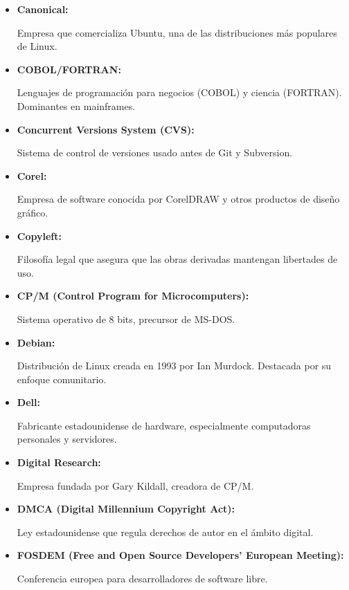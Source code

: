 \documentclass[a4paper,12pt]{article}
\begin{document}
\begin{itemize}
\item \hypertarget{canonical}{\textbf{Canonical:}} Empresa que comercializa
Ubuntu, una de las distribuciones más populares de Linux.  \label{canonical}

\item \hypertarget{cobolfortran}{\textbf{COBOL/FORTRAN:}} Lenguajes de
programación para negocios (COBOL) y ciencia (FORTRAN). Dominantes en
mainframes.  \label{cobolfortran}

\item \hypertarget{concurrent versions system }{\textbf{Concurrent Versions
System (CVS):}} Sistema de control de versiones usado antes de Git y Subversion.
\label{concurrent versions system }

\item \hypertarget{corel}{\textbf{Corel:}} Empresa de software conocida por
CorelDRAW y otros productos de diseño gráfico.  \label{corel}

\item \hypertarget{copyleft}{\textbf{Copyleft:}} Filosofía legal que asegura que
las obras derivadas mantengan libertades de uso.  \label{copyleft}

\item \hypertarget{cpm}{\textbf{CP/M (Control Program for Microcomputers):}}
Sistema operativo de 8 bits, precursor de MS-DOS.  \label{cpm}

\item \hypertarget{debia}{\textbf{Debian:}} Distribución de Linux creada en 1993
por Ian Murdock. Destacada por su enfoque comunitario.  \label{debian}

\item \hypertarget{dell}{\textbf{Dell:}} Fabricante estadounidense de hardware,
especialmente computadoras personales y servidores.  \label{dell}

\item \hypertarget{digitalresearch}{\textbf{Digital Research:}} Empresa fundada
por Gary Kildall, creadora de CP/M.  \label{digitalresearch}

\item \hypertarget{dmca}{\textbf{DMCA (Digital Millennium Copyright Act):}} Ley
estadounidense que regula derechos de autor en el ámbito digital.  \label{dmca}

\item \hypertarget{fosdem}{\textbf{FOSDEM (Free and Open Source Developers'
European Meeting):}} Conferencia europea para desarrolladores de software libre.
\label{fosdem}


\end{itemize}
\end{document}
